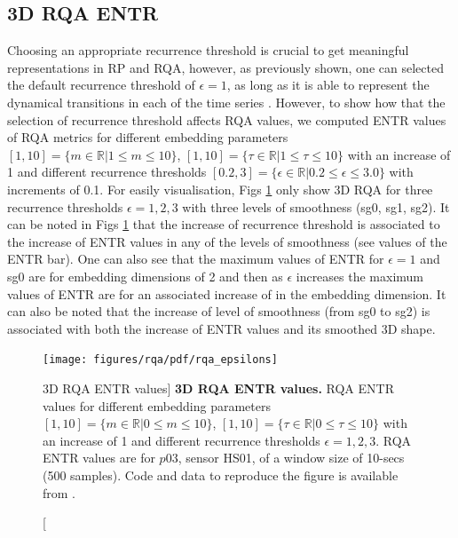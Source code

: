 \documentclass[fleqn,10pt]{wlscirep}
\begin{document}
\subsection*{3D RQA ENTR}
Choosing an appropriate recurrence threshold is crucial to get 
meaningful representations in RP and RQA, however, as previously shown, 
one can selected the default recurrence threshold of $\epsilon=1$, 
as long as it is able to represent the dynamical transitions 
in each of the time series \cite{marwan2011}. %
However, to show how that the selection of recurrence threshold affects RQA
values, 
we computed ENTR values of RQA metrics for different embedding parameters
$[1,10]= \{ m \in \mathbb{R} | 1 \le m \le 10  \} $,
$[1,10]= \{ \tau \in \mathbb{R} | 1 \le \tau \le 10  \} $
with an increase of 1
and different recurrence thresholds 
$[0.2,3]= \{ \epsilon \in \mathbb{R} | 0.2 \le \epsilon \le 3.0  \} $
with increments of 0.1.
For easily visualisation, Figs \ref{fig:RQA-IND} only show 3D RQA for 
three recurrence thresholds $\epsilon=1, 2, 3$ with three levels of 
smoothness (sg0, sg1, sg2). It can be noted in Figs \ref{fig:RQA-IND} 
that the increase of recurrence threshold is associated to the increase 
of ENTR values in any of the levels of smoothness (see values of the ENTR bar).
One can also see that the maximum values of ENTR 
for $\epsilon=1$ and sg0 are for embedding dimensions of 2 
and then as $\epsilon$ increases the maximum values of ENTR are for
an associated increase of in the embedding dimension.
It can also be noted that the increase of level of smoothness (from sg0 to sg2) 
is associated with both the increase of ENTR values and its smoothed 3D shape.

\begin{figure}
\centering
\texttt{[image: figures/rqa/pdf/rqa\_epsilons]}
    \caption
	[3D RQA ENTR values]{
	{\bf 3D RQA ENTR values.}
	RQA ENTR values 
	for different embedding parameters
	$[1,10]= \{ m \in \mathbb{R} | 0 \le m \le 10  \} $,
	$[1,10]= \{ \tau \in \mathbb{R} | 0 \le \tau \le 10  \} $
	with an increase of 1
	and different recurrence thresholds $\epsilon=1, 2, 3$.
	RQA ENTR values are for $p03$, sensor HS01, of a window size of 10-secs (500 samples).
	Code and data to reproduce the figure is available from \cite{srep2019}.
        }
    \label{fig:RQA-IND}
\end{figure}
\end{document}
